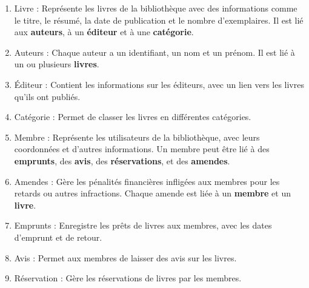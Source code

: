 \documentclass{article}
\begin{document}
\begin{enumerate}
  \item Livre : Représente les livres de la bibliothèque avec des informations comme le titre, le résumé, la date de publication et le nombre d'exemplaires. Il est lié aux \textbf{auteurs}, à un \textbf{éditeur} et à une \textbf{catégorie}.
  \item Auteurs : Chaque auteur a un identifiant, un nom et un prénom. Il est lié à un ou plusieurs \textbf{livres}.
\item Éditeur : Contient les informations sur les éditeurs, avec un lien vers les livres qu'ils ont publiés.
\item Catégorie : Permet de classer les livres en différentes catégories.
\item Membre : Représente les utilisateurs de la bibliothèque, avec leurs coordonnées et d'autres informations. Un membre peut être lié à des \textbf{emprunts}, des \textbf{avis}, des \textbf{réservations}, et des \textbf{amendes}.
\item Amendes : Gère les pénalités financières infligées aux membres pour les retards ou autres infractions. Chaque amende est liée à un \textbf{membre} et un \textbf{livre}.
\item Emprunts : Enregistre les prêts de livres aux membres, avec les dates d’emprunt et de retour.
\item Avis : Permet aux membres de laisser des avis sur les livres.
\item Réservation : Gère les réservations de livres par les membres.
\end{enumerate}
\end{document}
